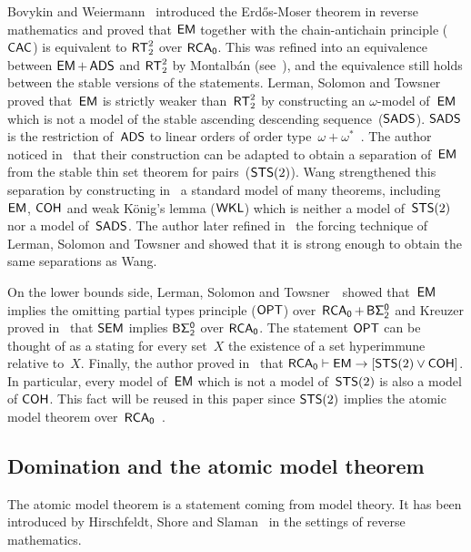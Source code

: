 Bovykin and Weiermann~\cite{Bovykin2005strength} introduced the Erd\H{o}s-Moser theorem in reverse mathematics
and proved that $\operatorname{\sf{EM}}$ together with the chain-antichain principle ($\operatorname{\sf{CAC}}$) is equivalent to $\operatorname{\sf{RT}}^2_2$ over $\operatorname{\sf{RCA}_0}$. 
This was refined into an equivalence between $\operatorname{\sf{EM}}+\operatorname{\sf{ADS}}$ and $\operatorname{\sf{RT}}^2_2$ by Montalb\'an (see~\cite{Bovykin2005strength}),
and the equivalence still holds between the stable versions of the statements.
Lerman, Solomon and Towsner~\cite{Lerman2013Separating} proved that~$\operatorname{\sf{EM}}$ 
is strictly weaker than~$\operatorname{\sf{RT}}^2_2$ by constructing an $\omega$-model
of~$\operatorname{\sf{EM}}$ which is not a model of the stable ascending descending sequence~($\operatorname{\sf{SADS}}$). $\operatorname{\sf{SADS}}$
is the restriction of~$\operatorname{\sf{ADS}}$ to linear orders of order type~$\omega+\omega^{*}$~\cite{Hirschfeldt2007Combinatorial}. 
The author noticed in~\cite{Patey2013note} that their construction can be adapted to obtain a separation of~$\operatorname{\sf{EM}}$ from the stable thin set theorem for pairs~($\operatorname{\sf{STS}}(2)$).
Wang strengthened this separation by constructing in~\cite{Wang2014Definability} a standard model of many theorems,
including~$\operatorname{\sf{EM}}$, $\operatorname{\sf{COH}}$ and weak K\"onig's lemma ($\operatorname{\sf{WKL}}$) which is neither a model of~$\operatorname{\sf{STS}}(2)$
nor a model of~$\operatorname{\sf{SADS}}$. The author later refined in~\cite{Patey2015Iterative,Patey2016weakness} the forcing technique of Lerman, Solomon and Towsner and showed that it is strong enough to obtain the same separations as Wang.

On the lower bounds side, Lerman, Solomon and Towsner~\cite{Lerman2013Separating}\ showed that~$\operatorname{\sf{EM}}$ 
implies the omitting partial types principle ($\operatorname{\sf{OPT}}$)
over~$\operatorname{\sf{RCA}_0} + \operatorname{\sf{B}\Sigma^0_2}$ and Kreuzer proved in~\cite{Kreuzer2012Primitive} that $\operatorname{\sf{SEM}}$ implies
$\operatorname{\sf{B}\Sigma^0_2}$ over $\operatorname{\sf{RCA}_0}$. The statement $\operatorname{\sf{OPT}}$ can be thought of as a stating 
for every set~$X$ the existence of a set hyperimmune relative to~$X$.
Finally, the author proved in~\cite{Patey2015Somewhere} that $\operatorname{\sf{RCA}_0} \vdash \operatorname{\sf{EM}} \rightarrow [\operatorname{\sf{STS}}(2) \vee \operatorname{\sf{COH}}]$.
In particular, every model of~$\operatorname{\sf{EM}}$ which is not a model of~$\operatorname{\sf{STS}}(2)$ is also a model of $\operatorname{\sf{COH}}$.
This fact will be reused in this paper since $\operatorname{\sf{STS}}(2)$ implies the atomic model theorem over~$\operatorname{\sf{RCA}_0}$~\cite{Patey2015Somewhere}.

\subsection{Domination and the atomic model theorem}\label{subsect:dominating-amt}

The atomic model theorem is a statement coming from model theory. It has been
introduced by Hirschfeldt, Shore and Slaman~\cite{Hirschfeldt2009atomic} in the settings of reverse mathematics.

